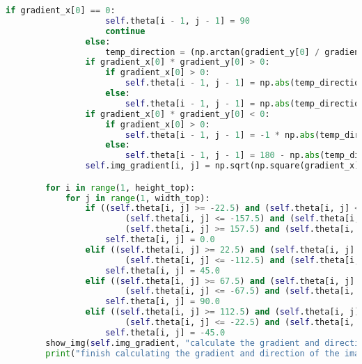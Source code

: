 \documentclass{hitreport}
\begin{document}
\begin{lstlisting}[language=python]
                if gradient_x[0] == 0:
                    self.theta[i - 1, j - 1] = 90
                    continue
                else:
                    temp_direction = (np.arctan(gradient_y[0] / gradient_x[0])) * 180 / np.pi
                if gradient_x[0] * gradient_y[0] > 0:
                    if gradient_x[0] > 0:
                        self.theta[i - 1, j - 1] = np.abs(temp_direction)
                    else:
                        self.theta[i - 1, j - 1] = np.abs(temp_direction) - 180
                if gradient_x[0] * gradient_y[0] < 0:
                    if gradient_x[0] > 0:
                        self.theta[i - 1, j - 1] = -1 * np.abs(temp_direction)
                    else:
                        self.theta[i - 1, j - 1] = 180 - np.abs(temp_direction)
                self.img_gradient[i, j] = np.sqrt(np.square(gradient_x) + np.square(gradient_y))

        for i in range(1, height_top):
            for j in range(1, width_top):
                if ((self.theta[i, j] >= -22.5) and (self.theta[i, j] < 22.5)) or (
                        (self.theta[i, j] <= -157.5) and (self.theta[i, j] >= -180)) or (
                        (self.theta[i, j] >= 157.5) and (self.theta[i, j] < 180)):
                    self.theta[i, j] = 0.0
                elif ((self.theta[i, j] >= 22.5) and (self.theta[i, j] < 67.5)) or (
                        (self.theta[i, j] <= -112.5) and (self.theta[i, j] >= -157.5)):
                    self.theta[i, j] = 45.0
                elif ((self.theta[i, j] >= 67.5) and (self.theta[i, j] < 112.5)) or (
                        (self.theta[i, j] <= -67.5) and (self.theta[i, j] >= -112.5)):
                    self.theta[i, j] = 90.0
                elif ((self.theta[i, j] >= 112.5) and (self.theta[i, j] < 157.5)) or (
                        (self.theta[i, j] <= -22.5) and (self.theta[i, j] >= -67.5)):
                    self.theta[i, j] = -45.0
        show_img(self.img_gradient, "calculate the gradient and direction of the image")
        print("finish calculating the gradient and direction of the image")


\end{lstlisting}
\end{document}
